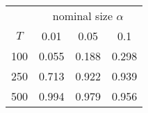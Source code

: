 % 
\begin{tabular}{cccc}
  \hline
  & \multicolumn{3}{c}{nominal size $\alpha$} \\
 $T$ & 0.01 & 0.05 & 0.1 \\
 \hline
100 & 0.055 & 0.188 & 0.298 \\ 
  250 & 0.713 & 0.922 & 0.939 \\ 
  500 & 0.994 & 0.979 & 0.956 \\ 
   \hline
\end{tabular}
